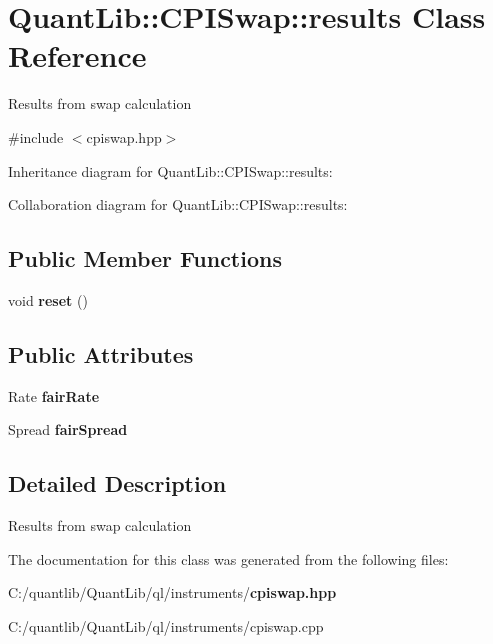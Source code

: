 \section{Quant\+Lib\+:\+:C\+P\+I\+Swap\+:\+:results Class Reference}
\label{class_quant_lib_1_1_c_p_i_swap_1_1results}


Results from swap calculation  




{\ttfamily \#include $<$cpiswap.\+hpp$>$}



Inheritance diagram for Quant\+Lib\+:\+:C\+P\+I\+Swap\+:\+:results\+:


Collaboration diagram for Quant\+Lib\+:\+:C\+P\+I\+Swap\+:\+:results\+:
\subsection*{Public Member Functions}
\begin{DoxyCompactItemize}
\item 
void {\bfseries reset} ()\label{class_quant_lib_1_1_c_p_i_swap_1_1results_a083d39e48afbbc8cfe8be63f5639b55c}

\end{DoxyCompactItemize}
\subsection*{Public Attributes}
\begin{DoxyCompactItemize}
\item 
Rate {\bfseries fair\+Rate}\label{class_quant_lib_1_1_c_p_i_swap_1_1results_a07f593da8093cfef831a2ad316a3efa2}

\item 
Spread {\bfseries fair\+Spread}\label{class_quant_lib_1_1_c_p_i_swap_1_1results_a7a07f8c06c60b2b8450b20826ae77ee8}

\end{DoxyCompactItemize}


\subsection{Detailed Description}
Results from swap calculation 

The documentation for this class was generated from the following files\+:\begin{DoxyCompactItemize}
\item 
C\+:/quantlib/\+Quant\+Lib/ql/instruments/{\bf cpiswap.\+hpp}\item 
C\+:/quantlib/\+Quant\+Lib/ql/instruments/cpiswap.\+cpp\end{DoxyCompactItemize}
